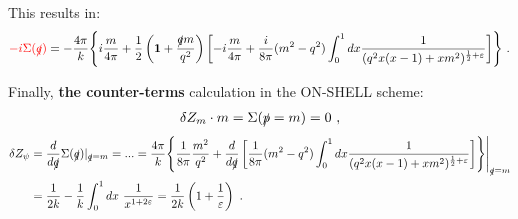 \documentclass[a4paper,11pt,DIV=12]{scrartcl}
\begin{document}
This results in: 
\begin{align*}
    \textcolor{red} {-i \Sigma(\slashed{q})}= -\frac{4 \pi}{k}\Biggl\{ i\frac{m}{4\pi} + \frac{1}{2} \left(\mathbf{1}+\frac{\slashed{q}m}{q^2}\right) \left[ -i\frac{m}{4 \pi} + \frac{i}{8 \pi} (m^2 - q^2)\int_0^1 dx \frac{1}{(q^2 x(x-1)+xm^2)^{\frac{1}{2}+\varepsilon}}  \right] \Biggr\}\ .
\end{align*}


Finally, \textbf{the counter-terms} calculation in the ON-SHELL scheme:
\begin{align*}
    \delta Z_m \cdot m = \Sigma(\slashed{p}=m) = 0\ ,
\end{align*}
\begin{align*}
    \delta Z_\psi &= \frac{d}{d \slashed{q}}\Sigma(\slashed{q})|_{\slashed{q}=m} =...=\frac{4 \pi}{k}\Biggl\{ \frac{1}{8\pi}\frac{m^2}{q^2} + \frac{d}{d\slashed{q}}\left[ \frac{1}{8 \pi} (m^2-q^2) \int_0^1 dx \frac{1}{(q^2 x (x-1)+xm^2)^{\frac{1}{2}+\varepsilon}}  \right]  \Biggr\}\Bigg| _{\slashed{q}=m}
    \\ &=\frac{1}{2k} -\frac{1}{k} \int_0^1 dx\  \frac{1}{x^{1+2\varepsilon}}=\frac{1}{2k}\left(1+\frac{1}{\varepsilon}\right)\ .
\end{align*}


% 
% 
\end{document}
